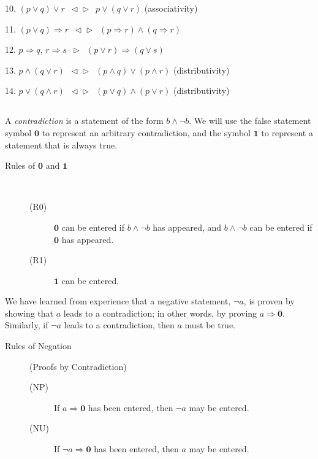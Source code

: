 \documentclass{article}
\newcommand{\0}{\mathbf 0}
\newcommand{\1}{\mathbf 1}
\newcommand{\der}{\vartriangleright}
\newcommand{\red}{\vartriangleleft}
\begin{document}
\begin{description}
  \item{10.} $(p \lor q) \lor r \enspace \red \der \enspace p \lor (q \lor r)$ \hfill (associativity)
  \item{11.} $(p \lor q) \Rightarrow r \enspace \red \der \enspace (p \Rightarrow r) \land (q \Rightarrow r)$
  \item{12.} $p \Rightarrow q$, $r \Rightarrow s \enspace \der \enspace (p \lor r) \Rightarrow (q \lor s)$
  \item{13.} $p \land (q \lor r) \enspace \red \der \enspace (p \land q) \lor (p \land r)$ \hfill (distributivity)
  \item{14.} $p \lor (q \land r) \enspace \red \der \enspace (p \lor q) \land (p \lor r)$ \hfill (distributivity)
\end{description}

\subsection*{ }

A \emph{contradiction} is a statement of the form $b \land \lnot b$. We will use the false statement symbol $\0$ to represent an arbitrary contradiction, and the symbol $\1$ to represent a statement that is always true.

\begin{description}
  \item[Rules of $\0$ and $\1$] $\ $
    \begin{description}
      \item[(R0)] $\0$ can be entered if $b \land \lnot b$ has appeared, and $b \land \lnot b$ can be entered if $\0$ has appeared.
      \item[(R1)] $\1$ can be entered.
    \end{description}
\end{description}

We have learned from experience that a negative statement, $\lnot a$, is proven by showing that $a$ leads to a contradiction; in other words, by proving $a \Rightarrow \0$. Similarly, if $\lnot a$ leads to a contradiction, then $a$ must be true.

\begin{description}
  \item[Rules of Negation] (Proofs by Contradiction)
    \begin{description}
      \item[(NP)] If $a \Rightarrow \0$ has been entered, then $\lnot a$ may be entered.
      \item[(NU)] If $\lnot a \Rightarrow \0$ has been entered, then $a$ may be entered.
    \end{description}
\end{description}
\end{document}
